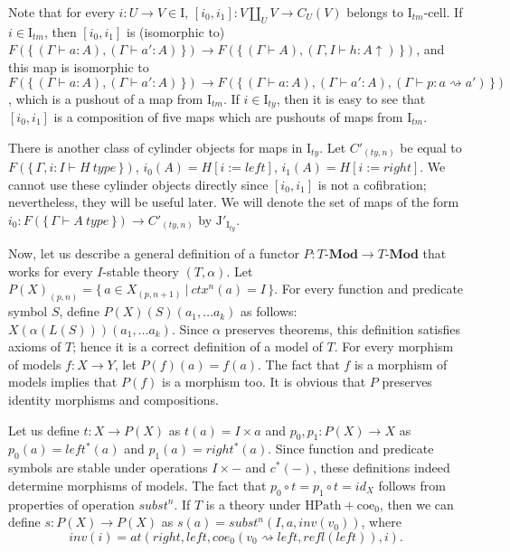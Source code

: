 \documentclass[reqno]{amsart}
\theoremstyle{definition}
\theoremstyle{remark}
\newcommand{\repl}{:=}
\newcommand{\idtype}{\rightsquigarrow}
\newcommand{\coe}{\mathrm{coe}}
\newcommand{\HPath}{\mathrm{HPath}}
\newcommand{\cat}[1]{\mathbf{#1}}
\newcommand{\Mod}[1]{#1\text{-}\cat{Mod}}
\newcommand{\type}{type}
\newcommand{\I}{\mathrm{I}}
\newcommand{\J}{\mathrm{J}}
\newcommand{\class}[2]{#1\text{-}\mathrm{#2}}
\newcommand{\Icell}[1][\I]{\class{#1}{cell}}
\newcommand{\cyli}{i}
\numberwithin{figure}{section}
\begin{document}
Note that for every $i : U \to V \in \I$, $[\cyli_0,\cyli_1] : V \amalg_U V \to C_U(V)$ belongs to $\Icell[\I_{tm}]$.
If $i \in \I_{tm}$, then $[\cyli_0,\cyli_1]$ is (isomorphic to) $F(\{\,(\Gamma \vdash a : A), (\Gamma \vdash a' : A)\,\}) \to F(\{\,(\Gamma \vdash A), (\Gamma, I \vdash h : A\!\uparrow)\,\})$,
and this map is isomorphic to $F(\{\,(\Gamma \vdash a : A), (\Gamma \vdash a' : A)\,\}) \to F(\{\,(\Gamma \vdash a : A), (\Gamma \vdash a' : A), (\Gamma \vdash p : a \idtype a')\,\})$,
which is a pushout of a map from $\I_{tm}$.
If $i \in \I_{ty}$, then it is easy to see that $[\cyli_0,\cyli_1]$ is a composition of five maps which are pushouts of maps from $\I_{tm}$.

There is another class of cylinder objects for maps in $\I_{ty}$.
Let $C'_{(ty,n)}$ be equal to $F(\{\,\Gamma, i : I \vdash H\ \type\,\})$, $\cyli_0(A) = H[i \repl left]$, $\cyli_1(A) = H[i \repl right]$.
We cannot use these cylinder objects directly since $[\cyli_0,\cyli_1]$ is not a cofibration; nevertheless, they will be useful later.
We will denote the set of maps of the form $\cyli_0 : F(\{\,\Gamma \vdash A\ \type\,\}) \to C'_{(ty,n)}$ by $\J'_{\I_{ty}}$.

Now, let us describe a general definition of a functor $P : \Mod{T} \to \Mod{T}$ that works for every $I$-stable theory $(T,\alpha)$.
Let $P(X)_{(p,n)} = \{\,a \in X_{(p,n+1)}\ |\ ctx^n(a) = I\,\}$.
For every function and predicate symbol $S$, define $P(X)(S)(a_1, \ldots a_k)$ as follows: $X(\alpha(L(S)))(a_1, \ldots a_k)$.
Since $\alpha$ preserves theorems, this definition satisfies axioms of $T$; hence it is a correct definition of a model of $T$.
For every morphism of models $f : X \to Y$, let $P(f)(a) = f(a)$.
The fact that $f$ is a morphism of models implies that $P(f)$ is a morphism too.
It is obvious that $P$ preserves identity morphisms and compositions.

Let us define $t : X \to P(X)$ as $t(a) = I \times a$ and $p_0,p_1 : P(X) \to X$ as $p_0(a) = left^*(a)$ and $p_1(a) = right^*(a)$.
Since function and predicate symbols are stable under operations $I \times -$ and $c^*(-)$, these definitions indeed determine morphisms of models.
The fact that $p_0 \circ t = p_1 \circ t = id_X$ follows from properties of operation $subst^n$.
If $T$ is a theory under $\HPath + \coe_0$, then we can define $s : P(X) \to P(X)$ as $s(a) = subst^n(I, a, inv(v_0))$, where
\[ inv(i) = at(right, left, coe_0(v_0 \idtype left, refl(left)), i). \]
\end{document}
